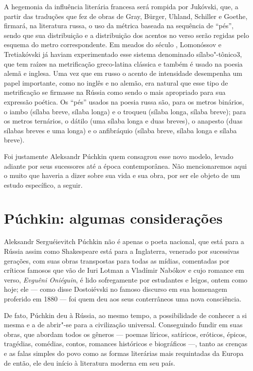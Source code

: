 A hegemonia da influência literária francesa será rompida por Jukóvski,
que, a partir das traduções que fez de obras de Gray, Bürger, Uhland,
Schiller e Goethe, firmará, na literatura russa, o uso da métrica baseada
na sequência de ``pés'', sendo que sua distribuição e a distribuição dos
acentos no verso serão regidas pelo esquema do metro correspondente. Em
meados do século , Lomonóssov e Tretiakóvski já haviam
experimentado esse sistema denomina­do sílabo"-tônico3, que tem raízes na
metrificação greco-latina clássica e tam­bém é usado na poesia alemã e
inglesa. Uma vez que em russo o acento de intensidade desempenha um
papel importante, como no inglês e no alemão, era natural que esse tipo
de metrificação se firmasse na Rússia como sendo o mais apropriado para
sua expressão poética. Os ``pés'' usados na poesia russa são, para os
metros binários, o iambo (sílaba breve, sílaba longa) e o troqueu
(sílaba longa, sílaba breve); para os metros ternários, o dátilo (uma
sílaba lon­ga e duas breves), o anapesto (duas sílabas breves e uma
longa) e o anfibráquio (sílaba breve, sílaba longa e sílaba breve).

Foi justamente Aleksandr Púchkin quem consagrou esse novo modelo, levado
adiante por seus sucessores até a época contemporânea. Não mencionaremos
aqui o muito que haveria a dizer sobre sua vida e sua obra, por ser ele
objeto de um estudo específico, a seguir.

\chapter{Púchkin: algumas considerações}

Aleksandr Serguéievitch Púchkin não é apenas o poeta nacional, que está
para a Rússia assim como Shakespeare está para a Inglaterra, venerado
por sucessivas gerações, com suas obras transpostas para todas as
mídias, comentadas por críticos famosos que vão de Iuri Lotman a
Vladímir Nabókov e cujo romance em verso, \emph{Evguêni Oniéguin}, é lido
sofregamente por estudantes e leigos, ontem como hoje; ele --- como disse
Dostoiévski no famoso discurso em sua homenagem proferido em 1880 --- foi quem deu aos seus conterrâneos uma nova consciência.

De fato, Púchkin deu à Rússia, ao mesmo tempo, a possibilidade de
conhecer a si mesma e a de abrir"-se para a civilização universal.
Conseguindo fundir em suas obras, que abordam todos os gêneros --- poemas
líricos, satíricos, eróticos, épicos, tragédias, comédias, contos,
romances históricos e biográficos ---, tanto as crenças e as falas simples
do povo como as formas literárias mais requintadas da Europa de então,
ele deu início à literatura moderna em seu país.

